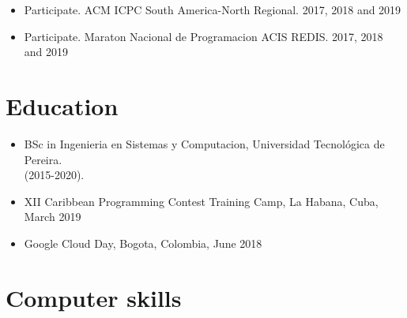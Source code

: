 \documentclass[11pt,a4paper,sans]{moderncv}        %
\begin{document}
\begin{itemize}
  \item{Participate. ACM ICPC South America-North Regional. 2017, 2018 and 2019}
  \item{Participate. Maraton Nacional de Programacion ACIS REDIS. 2017, 2018 and 2019} %
\end{itemize}

\section{Education}
\begin{itemize}
  \item{BSc in Ingenieria en Sistemas y Computacion, Universidad Tecnológica de Pereira. \\ (2015-2020).}
  \item{XII Caribbean Programming Contest Training Camp, La Habana, Cuba, March 2019}
  \item{ Google Cloud Day, Bogota, Colombia, June 2018}
\end{itemize}



\section{Computer skills}
\end{document}
